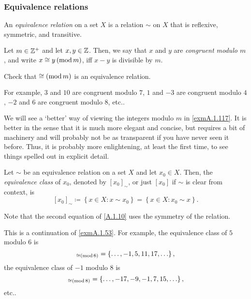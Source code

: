 \subsubsection{Equivalence relations}

\begin{dfn}
An \emph{equivalence relation} on a set $X$ is a relation $\sim$ on $X$ that is reflexive, symmetric, and transitive.
\end{dfn}
\begin{exm}\label{exmA.1.53}
Let $m\in \mathbb{Z} ^+$ and let $x,y\in \mathbb{Z}$.  Then, we say that $x$ and $y$ are \emph{congruent modulo $m$}, and write $x\cong y\left( \mathrm{mod}\, m\right)$, iff $x-y$ is divisible by $m$.
\begin{exr}
Check that $\cong \left( \mathrm{mod}\, m\right)$ is an equivalence relation.
\end{exr}
For example, $3$ and $10$ are congruent modulo $7$, $1$ and $-3$ are congruent modulo $4$, $-2$ and $6$ are congruent modulo $8$, etc..
\begin{rmk}
We will see a `better' way of viewing the integers modulo $m$ in \cref{exmA.1.117}.  It is better in the sense that it is much more elegant and concise, but requires a bit of machinery and will probably not be as transparent if you have never seen it before.  Thus, it is probably more enlightening, at least the first time, to see things spelled out in explicit detail.
\end{rmk}
\end{exm}
\begin{dfn}
Let $\sim$ be an equivalence relation on a set $X$ and let $x_0\in X$.  Then, the \emph{equivalence class} of $x_0$, denoted by $[x_0]_\sim$\index[notation]{$[x_0]_\sim$}, or just $[x_0]$\index[notation]{$[x_0]$} if $\sim$ is clear from context, is
\begin{equation}\label{A.1.10}
[x_0]_\sim \coloneqq \left\{ x\in X:x\sim x_0\right\} =\left\{ x\in X:x_0\sim x\right\} .
\end{equation}
\begin{rmk}
Note that the second equation of \eqref{A.1.10} uses the symmetry of the relation.
\end{rmk}
\end{dfn}
\begin{exm}\label{exmA.1.57}
This is a continuation of \cref{exmA.1.53}.  For example, the equivalence class of $5$ modulo $6$ is
\begin{equation}
[5]_{\cong \mmod{6}}=\left\{ \ldots ,-1,5,11,17,\ldots \right\} ,
\end{equation}
the equivalence class of $-1$ modulo $8$ is
\begin{equation}
[1]_{\cong \mmod{8}}=\left\{ \ldots ,-17,-9,-1,7,15,\ldots \right\} ,
\end{equation}
etc..
\end{exm}
